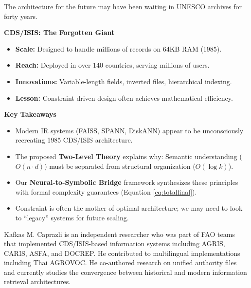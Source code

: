 \documentclass[manuscript,screen,nonacm]{acmart}
\newenvironment{sidebarbox}[1][]{%
  \def\sidebarboxtitle{#1}%
  \begin{oframed}%
  \noindent\textbf{\sidebarboxtitle}\par\smallskip
}{%
  \end{oframed}%
}
\begin{document}
The architecture for the future may have been waiting in UNESCO archives for forty years.

\begin{sidebarbox}[CDS/ISIS: The Forgotten Giant]
\begin{itemize}
    \item \textbf{Scale:} Designed to handle millions of records on 64KB RAM (1985).
    \item \textbf{Reach:} Deployed in over 140 countries, serving millions of users.
    \item \textbf{Innovations:} Variable-length fields, inverted files, hierarchical indexing.
    \item \textbf{Lesson:} Constraint-driven design often achieves mathematical efficiency.
\end{itemize}
\end{sidebarbox}

\begin{sidebarbox}[Key Takeaways]
\begin{itemize}
    \item Modern IR systems (FAISS, SPANN, DiskANN) appear to be unconsciously recreating 1985 CDS/ISIS architecture.
    \item The proposed \textbf{Two-Level Theory} explains why: Semantic understanding ($O(n \cdot d)$) must be separated from structural organization ($O(\log k)$).
    \item Our \textbf{Neural-to-Symbolic Bridge} framework synthesizes these principles with formal complexity guarantees (Equation \ref{eq:totalfinal}).
    \item Constraint is often the mother of optimal architecture; we may need to look to ``legacy'' systems for future scaling.
\end{itemize}
\end{sidebarbox}




\begin{acks}
Kafkas M. Caprazli is an independent researcher who was part of FAO teams that implemented CDS/ISIS-based information systems including AGRIS, CARIS, ASFA, and DOCREP. He contributed to multilingual implementations including Thai AGROVOC. He co-authored research on unified authority files \cite{caprazli2003} and currently studies the convergence between historical and modern information retrieval architectures.
\end{acks}
\end{document}
